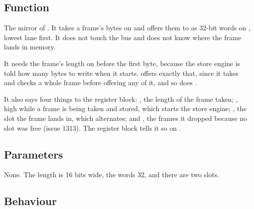 
%
{}

\subsection*{Function}

The mirror of . It takes a frame's bytes on
 and offers them to  as 32-bit words on
, lowest lane first. It does not touch the bus and does
not know where the frame lands in memory.

It needs the frame's length on  before the first byte,
because the store engine is told how many bytes to write when it
starts.  offers exactly that, since it takes and checks a
whole frame before offering any of it, and so does .

It also says four things to the register block: , the
length of the frame taken; , high while a frame is being
taken and stored, which starts the store engine; , the
slot the frame lands in, which alternates; and , the
frames it dropped because no slot was free (issue 1313). The register
block tells it so on .

\subsection*{Parameters}

None. The length is 16 bits wide, the words 32, and there are two
slots.


\subsection*{Behaviour}

